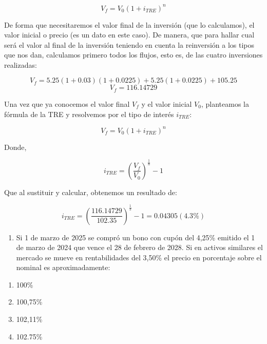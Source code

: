 \documentclass[
  letterpaper,
  DIV=11,
  numbers=noendperiod]{scrreprt}
\providecommand{\tightlist}{%
  \setlength{\itemsep}{0pt}\setlength{\parskip}{0pt}}\usepackage{longtable,booktabs,array}
\begin{document}
\begin{tcolorbox}
\begin{tcolorbox}[enhanced jigsaw, toprule=.15mm, left=2mm, arc=.35mm, breakable, bottomrule=.15mm, opacityback=0, rightrule=.15mm, leftrule=.75mm, colframe=quarto-callout-note-color-frame, colback=white]
\begin{minipage}[t]{\textwidth - 5.5mm}
\[V_f=V_0\left(1+i_{TRE}\right)^n\]

De forma que necesitaremos el valor final de la inversión (que lo
calculamos), el valor inicial o precio (es un dato en este caso). De
manera, que para hallar cual será el valor al final de la inversión
teniendo en cuenta la reinversión a los tipos que nos dan, calculamos
primero todos los flujos, esto es, de las cuatro inversiones realizadas:

\[V_f=5.25\left(1+0.03\right)\left(1+0.0225\right)+5.25\left(1+0.0225\right)+105.25\]
\[V_f=116.14729\]

Una vez que ya conocemos el valor final \(V_f\) y el valor inicial
\(V_0\), planteamos la fórmula de la TRE y resolvemos por el tipo de
interés \(i_{TRE}\):

\[V_f=V_0\left(1+i_{TRE}\right)^n\]

Donde,

\[i_{TRE}=\left(\frac{V_f }{V_0}\right)^{\frac{1 }{n }}-1\]

Que al sustituir y calcular, obtenemos un resultado de:

\[i_{TRE}=\left(\frac{116.14729}{102.35}\right)^{\frac{1}{3}}-1=0.04305(4.3\%)\]

\end{minipage}%
\end{tcolorbox}

\begin{enumerate}
\def\labelenumi{\arabic{enumi}.}
\setcounter{enumi}{2}
\tightlist
\item
  Si 1 de marzo de 2025 se compró un bono con cupón del 4,25\% emitido
  el 1 de marzo de 2024 que vence el 28 de febrero de 2028. Si en
  activos similares el mercado se mueve en rentabilidades del 3,50\% el
  precio en porcentaje sobre el nominal es aproximadamente:
\end{enumerate}

\begin{enumerate}
\def\labelenumi{\alph{enumi}.}
\item
  100\%
\item
  100,75\%
\item
  102,11\%
\item
  102.75\%
\end{enumerate}

\begin{tcolorbox}[enhanced jigsaw, toprule=.15mm, left=2mm, arc=.35mm, breakable, bottomrule=.15mm, opacityback=0, rightrule=.15mm, leftrule=.75mm, colframe=quarto-callout-note-color-frame, colback=white]
\begin{minipage}[t]{5.5mm}
\textcolor{quarto-callout-note-color}{\faInfo}
\end{minipage}%
\begin{minipage}[t]{\textwidth - 5.5mm}


\end{minipage}
\end{tcolorbox}
\end{tcolorbox}
\end{document}
